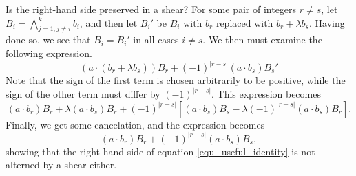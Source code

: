 \documentclass[12pt]{article}
\begin{document}
Is the right-hand side preserved in a shear?
For some pair of integers $r\neq s$, let $B_i=\bigwedge_{j=1,j\neq i}^k b_i$, and then let $B_i'$ be $B_i$ with $b_r$ replaced with $b_r+\lambda b_s$.
Having done so, we see that $B_i=B_i'$ in all cases $i\neq s$.  We then must examine the following expression.
\begin{equation}
(a\cdot(b_r+\lambda b_s))B_r+(-1)^{|r-s|}(a\cdot b_s)B_s'
\end{equation}
Note that the sign of the first term is chosen arbitrarily to be positive, while the sign of the other term must differ by $(-1)^{|r-s|}$.
This expression becomes
\begin{equation}
(a\cdot b_r)B_r + \lambda (a\cdot b_s)B_r + (-1)^{|r-s|}[(a\cdot b_s)B_s-\lambda(-1)^{|r-s|}(a\cdot b_s)B_r].
\end{equation}
Finally, we get some cancelation, and the expression becomes
\begin{equation}
(a\cdot b_r)B_r+(-1)^{|r-s|}(a\cdot b_s)B_s,
\end{equation}
showing that the right-hand side of equation \eqref{equ_useful_identity} is not alterned by a shear either.
\end{document}
